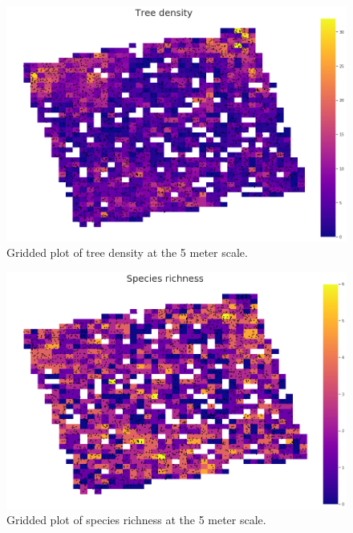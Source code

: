 \documentclass[12pt,a4paper]{article}
\begin{document}
\begin{figure}[H]
\centering
\includegraphics[scale=.45]{../figures/ESDA_density.png}
\caption{Gridded plot of tree density at the 5 meter scale.}
\label{ESDA_density} 
\end{figure}

\begin{figure}[H]
\centering
\includegraphics[scale=.45]{../figures/ESDA_richness.png}
\caption{Gridded plot of species richness at the 5 meter scale.}
\label{ESDA_richness} 
\end{figure}
\end{document}
